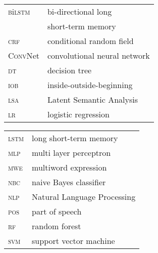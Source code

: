 \documentclass[output=paper
,modfonts
,nonflat]{langsci/langscibook}
\begin{document}
\begin{tabularx}{.52\textwidth}{ll}
 \textsc{b}i\textsc{lstm}  & bi-directional long \\ 
 & short-term memory  \\
\textsc{crf}  & conditional random field  \\
\textsc{ConvN}et  & convolutional neural network \\
\textsc{dt}  & decision tree  \\
\textsc{iob}  & inside-outside-beginning  \\
\textsc{lsa}  & Latent Semantic Analysis  \\
\textsc{lr}  & logistic regression  \\
\end{tabularx}
\begin{tabularx}{.48\textwidth}{ll}
\textsc{lstm}  & long short-term memory \\
\textsc{mlp}   & multi layer perceptron \\
\textsc{mwe} & multiword expression \\
\textsc{nbc}  & naive Bayes classifier  \\
\textsc{nlp} & Natural Language Processing  \\
\textsc{pos} & part of speech  \\
\textsc{rf}  & random forest \\
\textsc{svm}  & support vector machine \\
\end{tabularx}


\printbibliography[heading=subbibliography,notkeyword=this]
\end{document}
